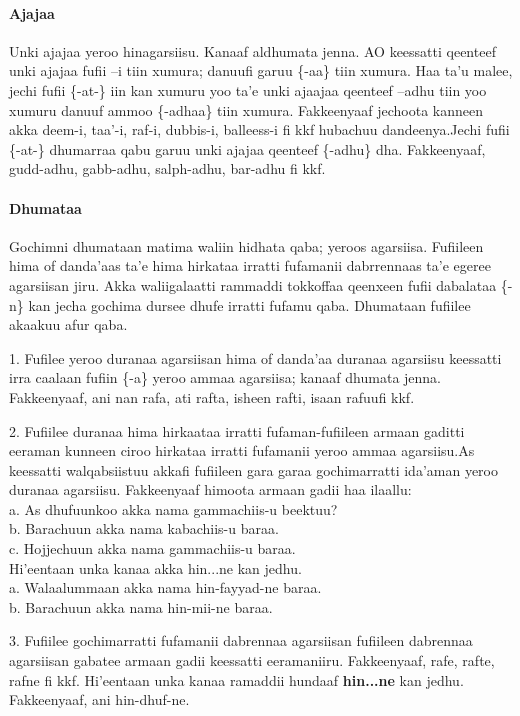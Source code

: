 \documentclass[11pt,b5paper]{book}
\begin{document}
\paragraph{Ajajaa}
 Unki ajajaa yeroo hinagarsiisu. Kanaaf aldhumata jenna. AO keessatti qeenteef unki ajajaa fufii –i tiin xumura; danuufi garuu \{-aa\} tiin xumura. Haa ta’u malee, jechi fufii \{-at-\} iin kan  xumuru yoo ta’e unki ajaajaa qeenteef –adhu tiin yoo xumuru  danuuf ammoo \{-adhaa\} tiin xumura. Fakkeenyaaf jechoota kanneen akka deem-i, taa’-i, raf-i, dubbis-i, balleess-i fi kkf hubachuu dandeenya.Jechi fufii \{-at-\} dhumarraa qabu garuu unki ajajaa qeenteef \{-adhu\} dha. Fakkeenyaaf, gudd-adhu, gabb-adhu, salph-adhu, bar-adhu fi kkf.
 
 \paragraph{Dhumataa}
Gochimni dhumataan matima waliin hidhata qaba; yeroos agarsiisa. Fufiileen hima of danda’aas ta’e hima hirkataa irratti fufamanii dabrrennaas ta’e egeree agarsiisan jiru. Akka waliigalaatti rammaddi tokkoffaa qeenxeen fufii dabalataa \{-n\} kan jecha gochima dursee dhufe irratti fufamu qaba. Dhumataan fufiilee akaakuu afur qaba. 

1. Fufilee yeroo duranaa agarsiisan hima of danda’aa duranaa agarsiisu keessatti irra caalaan fufiin \{-a\} yeroo ammaa agarsiisa; kanaaf dhumata jenna. Fakkeenyaaf, ani nan rafa, ati rafta, isheen rafti, isaan rafuufi kkf.

2. Fufiilee duranaa hima hirkaataa irratti fufaman-fufiileen armaan gaditti eeraman kunneen ciroo hirkataa irratti
fufamanii yeroo ammaa agarsiisu.As keessatti walqabsiistuu akkafi fufiileen gara garaa gochimarratti ida’aman yeroo duranaa agarsiisu. Fakkeenyaaf himoota armaan gadii haa ilaallu:\\
a. As dhufuunkoo akka nama gammachiis-u beektuu?\\
b. Barachuun akka nama kabachiis-u baraa.\\
c. Hojjechuun akka nama gammachiis-u baraa.\\
Hi’eentaan unka kanaa akka hin...ne kan jedhu. \\
a. Walaalummaan akka nama hin-fayyad-ne baraa.\\
b. Barachuun akka nama hin-mii-ne baraa.

3. Fufiilee gochimarratti fufamanii dabrennaa agarsiisan fufiileen dabrennaa agarsiisan gabatee armaan gadii keessatti eeramaniiru. Fakkeenyaaf, rafe, rafte, rafne fi kkf. Hi’eentaan unka kanaa ramaddii hundaaf \textbf{hin...ne }kan jedhu. Fakkeenyaaf, ani hin-dhuf-ne. 
\end{document}
